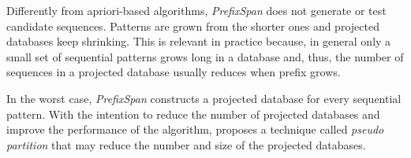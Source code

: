 Differently from apriori-based algorithms, \textit{PrefixSpan} does not generate or test candidate sequences. Patterns are grown from the shorter ones and projected databases keep shrinking. This is relevant in practice because, in general only a small set of sequential patterns grows long in a database and, thus, the number of sequences in a projected database usually reduces when prefix grows.

In the worst case, \textit{PrefixSpan} constructs a projected database for every sequential pattern. With the intention to reduce the number of projected databases and improve the performance of the algorithm, \cite{Pei} proposes a technique called \textit{pseudo partition} that may reduce the number and size of the projected databases.

